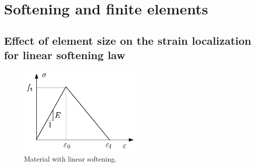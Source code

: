 \documentclass[main.tex]{subfiles}
\begin{document}
\chapter{Softening and finite elements}
\label{LEC:CohesiveZone}

\section{Effect of element size on the strain localization for linear softening law}

\begin{figure}
\centering
\includegraphics[width=6cm]{fig/Lecture08/fig_linear_softening}
\caption{Material with linear softening.}
\label{FIG_linear_softening}
\end{figure}
\end{document}

